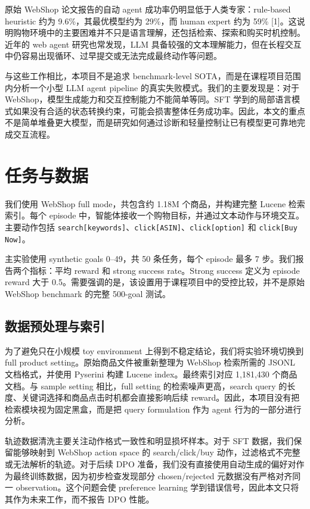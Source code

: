 \documentclass[11pt]{article}
\begin{document}
原始 WebShop 论文报告的自动 agent 成功率仍明显低于人类专家：rule-based heuristic 约为 9.6\%，其最优模型约为 29\%，而 human expert 约为 59\% [1]。这说明购物环境中的主要困难并不只是语言理解，还包括检索、探索和购买时机控制。近年的 web agent 研究也常发现，LLM 具备较强的文本理解能力，但在长程交互中仍容易出现循环、过早提交或无法完成最终动作等问题。

与这些工作相比，本项目不是追求 benchmark-level SOTA，而是在课程项目范围内分析一个小型 LLM agent pipeline 的真实失败模式。我们的主要发现是：对于 WebShop，模型生成能力和交互控制能力不能简单等同。SFT 学到的局部语言模式如果没有合适的状态转换约束，可能会损害整体任务成功率。因此，本文的重点不是简单堆叠更大模型，而是研究如何通过诊断和轻量控制让已有模型更可靠地完成交互流程。

\section{任务与数据}

我们使用 WebShop full mode，共包含约 1.18M 个商品，并构建完整 Lucene 检索索引。每个 episode 中，智能体接收一个购物目标，并通过文本动作与环境交互。主要动作包括 \texttt{search[keywords]}、\texttt{click[ASIN]}、\texttt{click[option]} 和 \texttt{click[Buy Now]}。

主实验使用 synthetic goals 0--49，共 50 条任务，每个 episode 最多 7 步。我们报告两个指标：平均 reward 和 strong success rate。Strong success 定义为 episode reward 大于 0.5。需要强调的是，该设置用于课程项目中的受控比较，并不是原始 WebShop benchmark 的完整 500-goal 测试。

\subsection{数据预处理与索引}

为了避免只在小规模 toy environment 上得到不稳定结论，我们将实验环境切换到 full product setting。原始商品文件被重新整理为 WebShop 检索所需的 JSONL 文档格式，并使用 Pyserini 构建 Lucene index。最终索引对应 1,181,430 个商品文档。与 sample setting 相比，full setting 的检索噪声更高，search query 的长度、关键词选择和商品点击时机都会直接影响后续 reward。因此，本项目没有把检索模块视为固定黑盒，而是把 query formulation 作为 agent 行为的一部分进行分析。

轨迹数据清洗主要关注动作格式一致性和明显损坏样本。对于 SFT 数据，我们保留能够映射到 WebShop action space 的 search/click/buy 动作，过滤格式不完整或无法解析的轨迹。对于后续 DPO 准备，我们没有直接使用自动生成的偏好对作为最终训练数据，因为初步检查发现部分 chosen/rejected 元数据没有严格对齐同一 observation。这个问题会使 preference learning 学到错误信号，因此本文只将其作为未来工作，而不报告 DPO 性能。
\end{document}
